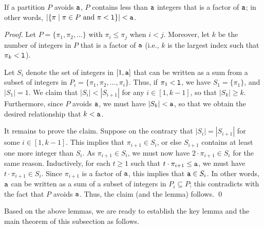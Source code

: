 \begin{lemma} \label{lem:at-most-a-1}
If a partition $P$ avoids $\mathtt{a}$, $P$ contains less than $\mathtt{a}$ integers that is a factor of $\mathtt{a}$;  
in other words, $| \{ \pi \mid \pi \in P \mbox{\ and\ } \pi < \mathtt{l} \}|  < \mathtt{a}$. 
\end{lemma}
\begin{proof}
Let $P = \{ \pi_1, \pi_2, \ldots \}$ with $\pi_i \leq \pi_j$ when $i < j$.  
Moreover, let $k$ be the number of integers in $P$ that is a factor of $\mathtt{a}$
(i.e., $k$ is the largest index such that $\pi_k < \mathtt{l}$).   

\medskip

\noindent
Let $S_i$ denote the set of integers in $[1,\mathtt{a}]$ that can be written as a sum from a subset of
integers in $P_i = \{ \pi_1, \pi_2, \ldots, \pi_i \}$.   Thus, if $\pi_1 < \mathtt{l}$,
we have $S_1 = \{ \pi_1 \}$, and $|S_1| = 1$.
We claim that $|S_i| < |S_{i+1}|$ for any $i \in [1,k-1]$, so that $|S_k| \geq k$.  
Furthermore, since $P$ avoids $\mathtt{a}$, we must have $|S_k| < \mathtt{a}$, so that we obtain
the desired relationship that $k < \mathtt{a}$.

\medskip

\noindent
It remains to prove the claim.  Suppose on the contrary that $|S_i| = |S_{i+1}|$ for some $i \in [1,k-1]$.  
This implies that $\pi_{i+1} \in S_i$, or else $S_{i+1}$ contains at least one more integer than $S_i$.
As $\pi_{i+1} \in S_i$, we must now have $2\cdot \pi_{i+1} \in S_i$ for the same reason.
Inductively, for each $t \geq 1$ such that $t\cdot \pi_{i+1} \leq \mathtt{a}$, we must have $t\cdot \pi_{i+1} \in S_i$.
Since $\pi_{i+1}$ is a factor of $\mathtt{a}$, this implies that $\mathtt{a} \in S_i$.  In other words, $\mathtt{a}$
can be written as a sum of a subset of integers in $P_i \subseteq P$; this contradicts with the fact that
$P$ avoids $\mathtt{a}$.  Thus, the claim (and the lemma) follows.
\qed
\end{proof}

Based on the above lemmas, we are ready to establish 
the key lemma and the main theorem of this subsection as follows.

